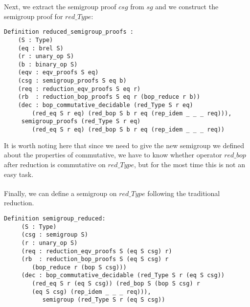 \documentclass[a4paper,12pt,twoside,openright]{report}
\begin{document}
Next, we extract the semigroup proof $csg$ from $sg$ and we construct the semigroup proof for $red\_Type$:
\begin{lstlisting}
Definition reduced_semigroup_proofs :
    (S : Type)
    (eq : brel S)
    (r : unary_op S)
    (b : binary_op S)
    (eqv : eqv_proofs S eq)
    (csg : semigroup_proofs S eq b)
    (req : reduction_eqv_proofs S eq r)     
    (rb  : reduction_bop_proofs S eq r (bop_reduce r b)) 
    (dec : bop_commutative_decidable (red_Type S r eq) 
    	(red_eq S r eq) (red_bop S b r eq (rep_idem _ _ _ req))), 
     semigroup_proofs (red_Type S r eq) 
     	(red_eq S r eq) (red_bop S b r eq (rep_idem _ _ _ req))
\end{lstlisting}
It is worth noting here that since we need to give the new semigroup we defined about the properties of commutative, we have to know whether operator $red\_bop$ after reduction is commutative on $red\_Type$, but for the most time this is not an easy task.\\\\

Finally, we can define a semigroup on $red\_Type$ following the traditional reduction.
\begin{lstlisting}
Definition semigroup_reduced:
     (S : Type)
     (csg : semigroup S)
     (r : unary_op S)
     (req : reduction_eqv_proofs S (eq S csg) r)
     (rb  : reduction_bop_proofs S (eq S csg) r 
     	(bop_reduce r (bop S csg)))
     (dec : bop_commutative_decidable (red_Type S r (eq S csg)) 
     	(red_eq S r (eq S csg)) (red_bop S (bop S csg) r 
     	(eq S csg) (rep_idem _ _ _ req))),      
           semigroup (red_Type S r (eq S csg))
\end{lstlisting}
\end{document}
